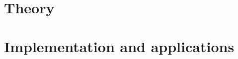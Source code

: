 \documentclass[12pt,a4paper,fleqn]{report}
\begin{document}



\tableofcontents


\part{Theory}



%
%



%

%
%
\part{Implementation and applications}


%






%

%

%
% 
\end{document}
